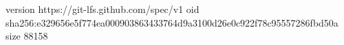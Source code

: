 version https://git-lfs.github.com/spec/v1
oid sha256:e329656e5f774ea000903863433764d9a3100d26e0c922f78c95557286fbd50a
size 88158
